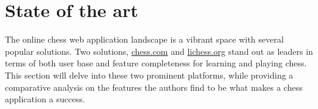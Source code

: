 \section{State of the art}\label{sec:state-of-the-art}

The online chess web application landscape is a vibrant space with several popular
solutions.
Two solutions, \url{chess.com} and \url{lichess.org} stand out as leaders in terms
of both user base and feature completeness for learning and playing chess.
This section will delve into these two prominent platforms, while providing a
comparative analysis on the features the authors find to be what makes a
chess application a success.





